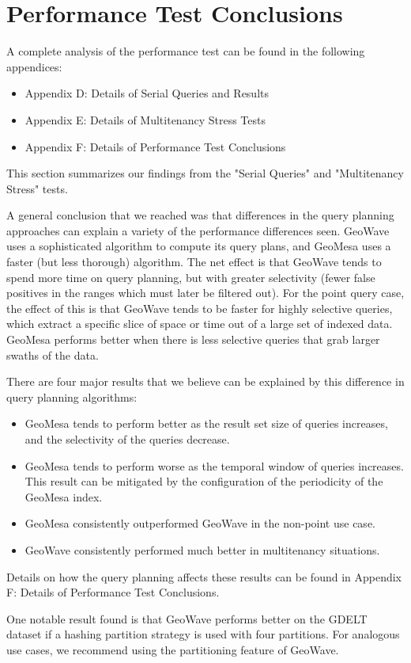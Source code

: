 \section{Performance Test Conclusions}
\label{sec:results}

A complete analysis of the performance test can be found in the following appendices:

\begin{itemize}
\item Appendix D: Details of Serial Queries and Results
\item Appendix E: Details of Multitenancy Stress Tests
\item Appendix F: Details of Performance Test Conclusions
\end{itemize}

This section summarizes our findings from the "Serial Queries" and "Multitenancy Stress" tests.

A general conclusion that we reached was that differences in the query planning approaches can explain a variety of the performance differences seen. GeoWave uses a sophisticated algorithm to compute its query plans, and GeoMesa uses a faster (but less thorough) algorithm. The net effect is that GeoWave tends to spend more time on query planning, but with greater selectivity (fewer false positives in the ranges which must later be filtered out). For the point query case, the effect of this is that GeoWave tends to be faster for highly selective queries, which extract a specific slice of space or time out of a large set of indexed data. GeoMesa performs better when there is less selective queries that grab larger swaths of the data. 

There are four major results that we believe can be explained by this difference in query planning algorithms:

\begin{itemize}
\item GeoMesa tends to perform better as the result set size of queries increases, and the selectivity of the queries decrease.
\item GeoMesa tends to perform worse as the temporal window of queries increases. This result can be mitigated by the configuration of the periodicity of the GeoMesa index.
\item GeoMesa consistently outperformed GeoWave in the non-point use case.
\item GeoWave consistently performed much better in multitenancy situations.
\end{itemize}

Details on how the query planning affects these results can be found in Appendix F: Details of Performance Test Conclusions.

One notable result found is that GeoWave performs better on the GDELT dataset if a hashing partition strategy is used with four partitions. For analogous use cases, we recommend using the partitioning feature of GeoWave.
